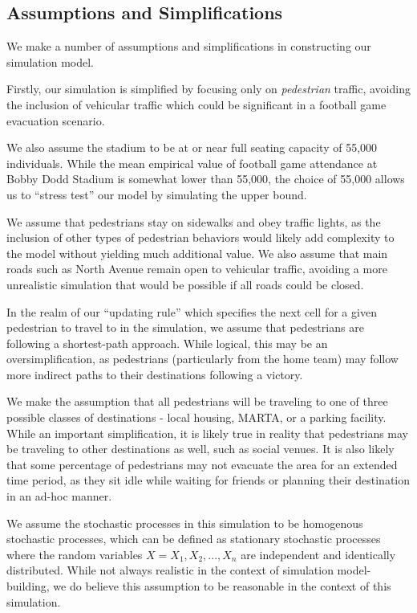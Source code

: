 \documentclass[12pt]{article}
\begin{document}
\subsection{Assumptions and Simplifications}
We make a number of assumptions and simplifications in constructing our
simulation model.

Firstly, our simulation is simplified by focusing only on
\textit{pedestrian} traffic, avoiding the inclusion of vehicular traffic which
could be significant in a football game evacuation scenario.

We also assume the stadium to be at or near full seating capacity of 55,000
individuals. While the mean empirical value of football game attendance at
Bobby Dodd Stadium is somewhat lower than 55,000, the choice
of 55,000 allows us to ``stress test'' our model by simulating the upper bound.

We assume that pedestrians stay on sidewalks and obey traffic lights, as the
inclusion of other types of pedestrian behaviors would likely add complexity
to the model without yielding much additional value. We also assume that main
roads such as North Avenue remain open to vehicular traffic, avoiding a more
unrealistic simulation that would be possible if all roads could be closed.

In the realm of our ``updating rule'' which specifies the next cell for a given
pedestrian to travel to in the simulation, we assume that pedestrians are
following a shortest-path approach. While logical, this may be an
oversimplification, as pedestrians (particularly from the home team) may follow
more indirect paths to their destinations following a victory.

We make the assumption that all pedestrians will be traveling to one of three
possible classes of destinations - local housing, MARTA, or a parking facility.
While an important simplification, it is likely true in reality that pedestrians
may be traveling to other destinations as well, such as social venues. It is
also likely that some percentage of pedestrians may not evacuate the area for
an extended time period, as they sit idle while waiting for friends or planning
their destination in an ad-hoc manner.

We assume the stochastic processes in this simulation to be homogenous
stochastic processes, which can be defined as stationary stochastic processes
where the random variables $X = X_1, X_2, ..., X_n$ are independent and
identically distributed. While not always realistic in the context of
simulation model-building, we do believe this assumption to be reasonable in
the context of this simulation.
\end{document}

